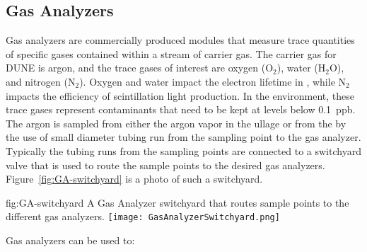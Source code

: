 \subsection{Gas Analyzers}
\label{sec:fdgen-slow-cryo-gas-anlyz}

 Gas analyzers are commercially produced modules that measure trace quantities of specific gases contained within a stream of carrier gas. The carrier gas for DUNE is argon, and the trace gases of interest are oxygen ($\text{O}_2$), water ($\text{H}_2\text{O}$), and nitrogen ($\text{N}_2$). Oxygen and water impact the electron lifetime in , while $\text{N}_2$ impacts the efficiency of scintillation light production. In the  environment, these trace gases represent contaminants that need to be kept at levels below \SI{0.1}{ppb}.
The argon is sampled from either the argon vapor in the ullage or from the  by the use of small diameter tubing run from the sampling point to the gas analyzer. Typically the tubing runs from the sampling points are connected to a switchyard valve that is used to route the sample points to the desired gas analyzers. Figure~\ref{fig:GA-switchyard} is a photo of such a switchyard.

\begin{dunefigure}{fig:GA-switchyard}
  {A Gas Analyzer switchyard that routes sample points to the different gas analyzers.}
  \texttt{[image: GasAnalyzerSwitchyard.png]}%
\end{dunefigure}

Gas analyzers can be used to:

